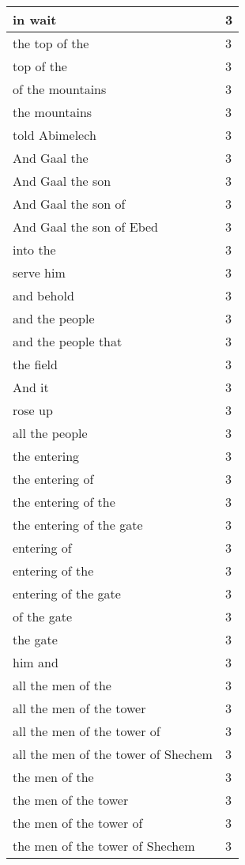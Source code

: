 \begin{center}
\begin{longtable}{|p{3.0in}|p{0.5in}|}
in wait & 3\\ \hline 
the top of the & 3\\ \hline 
top of the & 3\\ \hline 
of the mountains & 3\\ \hline 
the mountains & 3\\ \hline 
told Abimelech & 3\\ \hline 
And Gaal the & 3\\ \hline 
And Gaal the son & 3\\ \hline 
And Gaal the son of & 3\\ \hline 
And Gaal the son of Ebed & 3\\ \hline 
into the & 3\\ \hline 
serve him & 3\\ \hline 
and behold & 3\\ \hline 
and the people & 3\\ \hline 
and the people that & 3\\ \hline 
the field & 3\\ \hline 
And it & 3\\ \hline 
rose up & 3\\ \hline 
all the people & 3\\ \hline 
the entering & 3\\ \hline 
the entering of & 3\\ \hline 
the entering of the & 3\\ \hline 
the entering of the gate & 3\\ \hline 
entering of & 3\\ \hline 
entering of the & 3\\ \hline 
entering of the gate & 3\\ \hline 
of the gate & 3\\ \hline 
the gate & 3\\ \hline 
him and & 3\\ \hline 
all the men of the & 3\\ \hline 
all the men of the tower & 3\\ \hline 
all the men of the tower of & 3\\ \hline 
all the men of the tower of Shechem & 3\\ \hline 
the men of the & 3\\ \hline 
the men of the tower & 3\\ \hline 
the men of the tower of & 3\\ \hline 
the men of the tower of Shechem & 3\\ \hline 

\end{longtable}
\end{center}

